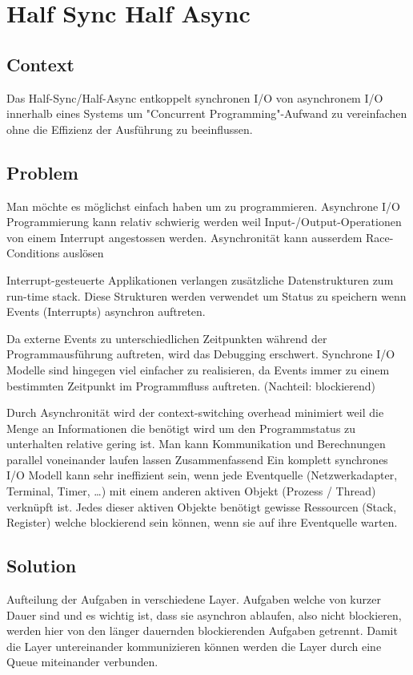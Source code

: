 \chapter{Half Sync Half Async}

\section{Context}
Das Half-Sync/Half-Async entkoppelt synchronen I/O von asynchronem I/O innerhalb eines Systems um "Concurrent Programming"-Aufwand zu vereinfachen ohne die Effizienz der Ausführung zu beeinflussen.

\section{Problem}
Man möchte es möglichst einfach haben um zu programmieren. Asynchrone I/O Programmierung kann relativ schwierig werden weil Input-/Output-Operationen von einem Interrupt angestossen werden. Asynchronität kann ausserdem Race-Conditions auslösen

Interrupt-gesteuerte Applikationen verlangen zusätzliche Datenstrukturen zum run-time stack. Diese Strukturen werden verwendet um Status zu speichern wenn Events (Interrupts) asynchron auftreten.

Da externe Events zu unterschiedlichen Zeitpunkten während der Programmausführung auftreten, wird das Debugging erschwert. Synchrone I/O Modelle sind hingegen viel einfacher zu realisieren, da Events immer zu einem bestimmten Zeitpunkt im Programmfluss auftreten. (Nachteil: blockierend)

Durch Asynchronität wird der context-switching overhead minimiert weil die Menge an Informationen die benötigt wird um den Programmstatus zu unterhalten relative gering ist. Man kann Kommunikation und Berechnungen parallel voneinander laufen lassen Zusammenfassend Ein komplett synchrones I/O Modell kann sehr ineffizient sein, wenn jede Eventquelle (Netzwerkadapter, Terminal, Timer, …) mit einem anderen aktiven Objekt (Prozess / Thread) verknüpft ist.
Jedes dieser aktiven Objekte benötigt gewisse Ressourcen (Stack, Register) welche blockierend sein können, wenn sie auf ihre Eventquelle warten.

\section{Solution}
Aufteilung der Aufgaben in verschiedene Layer. Aufgaben welche von kurzer Dauer sind und es wichtig ist, dass sie asynchron ablaufen, also nicht blockieren, werden hier von den länger dauernden blockierenden Aufgaben getrennt. Damit die Layer untereinander kommunizieren können werden die Layer durch eine Queue miteinander verbunden.
